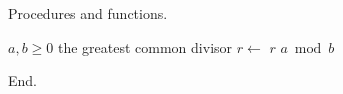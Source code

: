 \documentclass{article}
\begin{document}
Procedures and functions.

\begin{algorithm}[h]
\caption{Procedures}
\begin{algorithmic}[1]
\Require $a, b \ge 0$
\Ensure the greatest common divisor
\State $r \gets$ 
\State \Return $r$
\EndProcedure
{}
\State \Return $a \bmod b$
\EndFunction
{}
\State {}
\EndProcedure
\end{algorithmic}
\end{algorithm}

End.
\end{document}
